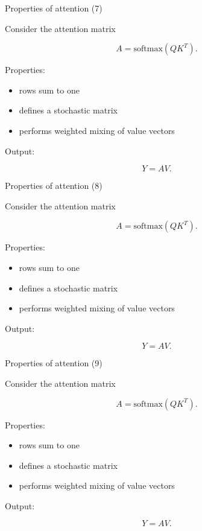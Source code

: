 \documentclass[aspectratio=169]{beamer}
\begin{document}
\begin{frame}{Properties of attention (7)}

Consider the attention matrix

\[
A = \text{softmax}(QK^T).
\]

Properties:

\begin{itemize}
\item rows sum to one
\item defines a stochastic matrix
\item performs weighted mixing of value vectors
\end{itemize}

Output:

\[
Y = AV.
\]

\end{frame}


\begin{frame}{Properties of attention (8)}

Consider the attention matrix

\[
A = \text{softmax}(QK^T).
\]

Properties:

\begin{itemize}
\item rows sum to one
\item defines a stochastic matrix
\item performs weighted mixing of value vectors
\end{itemize}

Output:

\[
Y = AV.
\]

\end{frame}


\begin{frame}{Properties of attention (9)}

Consider the attention matrix

\[
A = \text{softmax}(QK^T).
\]

Properties:

\begin{itemize}
\item rows sum to one
\item defines a stochastic matrix
\item performs weighted mixing of value vectors
\end{itemize}

Output:

\[
Y = AV.
\]

\end{frame}
\end{document}
